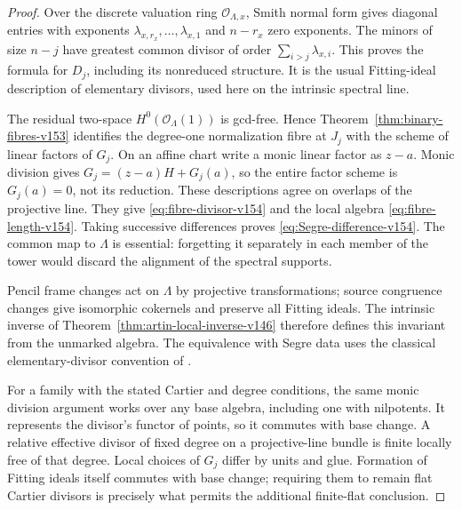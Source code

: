 \documentclass[11pt,reqno]{amsart}
\numberwithin{equation}{section}
\theoremstyle{definition}\newtheorem{definition}[theorem]{Definition}
\theoremstyle{remark}\newtheorem{remark}[theorem]{Remark}
\newcommand{\OO}{\mathcal O}\newcommand{\II}{\mathcal I}
\begin{document}
\begin{proof}
Over the discrete valuation ring $\OO_{\Lambda,x}$, Smith normal
form gives diagonal entries with exponents
$\lambda_{x,r_x},\ldots,\lambda_{x,1}$ and $n-r_x$ zero
exponents. The minors of size $n-j$ have greatest common divisor
of order $\sum_{i>j}\lambda_{x,i}$. This proves the formula for
$D_j$, including its nonreduced structure. It is the usual
Fitting-ideal description of elementary divisors, used here on the
intrinsic spectral line.

The residual two-space $H^0(\OO_\Lambda(1))$ is gcd-free. Hence
Theorem~\ref{thm:binary-fibres-v153} identifies the degree-one
normalization fibre at $J_j$ with the scheme of linear factors of
$G_j$. On an affine chart write a monic linear factor as $z-a$.
Monic division gives $G_j=(z-a)H+G_j(a)$, so the entire factor
scheme is $G_j(a)=0$, not its reduction. These descriptions agree
on overlaps of the projective line. They give
\eqref{eq:fibre-divisor-v154} and the local algebra
\eqref{eq:fibre-length-v154}. Taking successive differences proves
\eqref{eq:Segre-difference-v154}. The common map to $\Lambda$ is
essential: forgetting it separately in each member of the tower
would discard the alignment of the spectral supports.

Pencil frame changes act on $\Lambda$ by projective transformations;
source congruence changes give isomorphic cokernels and preserve all
Fitting ideals. The intrinsic inverse of
Theorem~\ref{thm:artin-local-inverse-v146} therefore defines this
invariant from the unmarked algebra. The equivalence with Segre data
uses the classical elementary-divisor convention of
\cite[\S5]{FevolaMandelshtamSturmfels}.

For a family with the stated Cartier and degree conditions, the same
monic division argument works over any base algebra, including one
with nilpotents. It represents the divisor's functor of points, so
it commutes with base change. A relative effective divisor of fixed
degree on a projective-line bundle is finite locally free of that
degree. Local choices of $G_j$ differ by units and glue. Formation
of Fitting ideals itself commutes with base change; requiring them
to remain flat Cartier divisors is precisely what permits the
additional finite-flat conclusion.
\end{proof}
\end{document}
